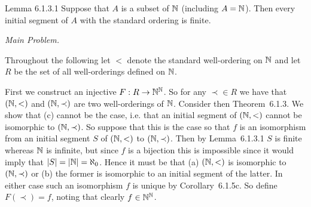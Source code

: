 \begin{solution}
    \begin{statement}{Lemma 6.1.3.1}
        Suppose that $A$ is a subset of $\mathbb{N}$ (including $A = \mathbb{N}$).
        Then every initial segment of $A$ with the standard ordering is finite.
    \end{statement}


    \emph{Main Problem.}

    Throughout the following let $<$ denote the standard well-ordering on $\mathbb{N}$ and let $R$ be the set of all well-orderings defined on $\mathbb{N}$.

    First we construct an injective $F: R \to \mathbb{N}^{\mathbb{N}}$.
    So for any $\prec \in R$ we have that $(\mathbb{N}, <)$ and $(\mathbb{N}, \prec)$ are two well-orderings of $\mathbb{N}$.
    Consider then Theorem~6.1.3.
    We show that (c) cannot be the case, i.e. that an initial segment of $(\mathbb{N}, <)$ cannot be isomorphic to $(\mathbb{N}, \prec)$.
    So suppose that this is the case so that $f$ is an isomorphism from an initial segment $S$ of $(\mathbb{N}, <)$ to $(\mathbb{N}, \prec)$.
    Then by  Lemma~6.1.3.1 $S$ is finite whereas $\mathbb{N}$ is infinite, but since $f$ is a bijection this is impossible since it would imply that $|S| = |\mathbb{N}| = {\aleph_0}$.
    Hence it must be that (a) $(\mathbb{N}, <)$ is isomorphic to $(\mathbb{N}, \prec)$ or (b) the former is isomorphic to an initial segment of the latter.
    In either case such an isomorphism $f$ is unique by Corollary~6.1.5c.
    So define $F(\prec) = f$, noting that clearly $f \in \mathbb{N}^{\mathbb{N}}$.


\end{solution}
